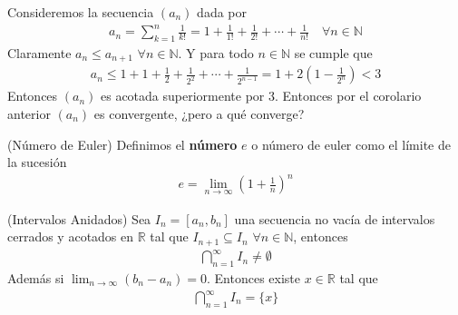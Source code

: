 \documentclass[12pt]{book}
\begin{document}
\begin{eje}{}{}
    Consideremos la secuencia $(a_n)$ dada por 
    \begin{align*}
        a_n= \sum_{k=1}^n \frac{1}{k!}=1+ \frac{1}{1!}+ \frac{1}{2!}+ \cdots + \frac{1}{n!} \quad \forall n \in \mathbb{N}
    \end{align*}
    Claramente $a_n \leq a_{n+1}$ $\forall n \in \mathbb{N}$. Y para todo $n \in \mathbb{N}$ se cumple que
    \begin{align*}
        a_n \leq 1+ 1 + \frac{1}{2}+\frac{1}{2^2}+ \cdots + \frac{1}{2^{n-1}}=1+2\left(1-\frac{1}{2^n} \right) < 3
    \end{align*}
    Entonces $(a_n)$ es acotada superiormente por 3. Entonces por el corolario anterior $(a_n)$ es convergente, ¿pero a qué converge?
\end{eje}
\begin{defi}{(Número de Euler)}{}
    Definimos el \textbf{número} $e$ o número de euler como el límite de la sucesión
    \begin{align*}
        e=\lim_{n \to \infty}\left( 1+\frac{1}{n}\right)^n
    \end{align*}
\end{defi}
\begin{teo}{(Intervalos Anidados)}{}
    Sea $I_n =[a_n,b_n]$ una secuencia no vacía de intervalos cerrados y acotados  en $\mathbb{R}$ tal que $I_{n+1} \subseteq I_n$ $\forall n \in \mathbb{N}$, entonces
    \begin{align*}
        \bigcap_{n=1}^\infty I_n \neq \emptyset
    \end{align*}
    Además si $\displaystyle \lim_{n \to \infty}( b_n -a_n)=0$. Entonces existe $ x \in \mathbb{R}$ tal que
    \begin{align*}
        \bigcap_{n=1}^\infty I_n = \{x \}
    \end{align*}
\end{teo}
\end{document}
